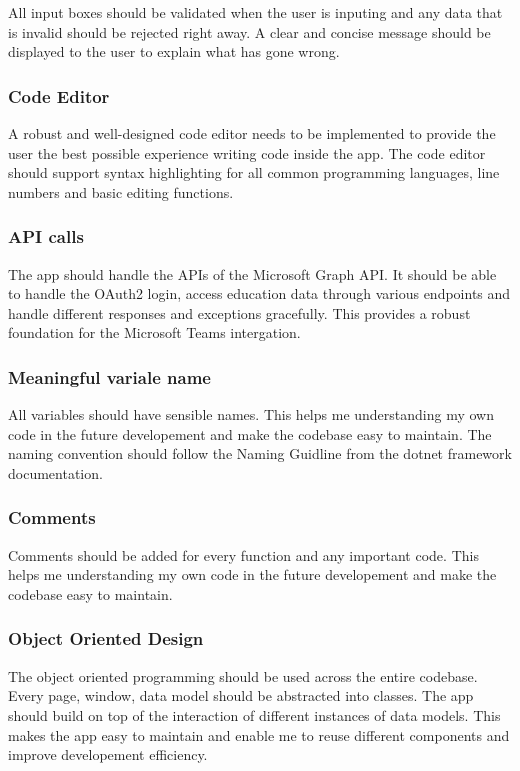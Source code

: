 \documentclass[a4paper]{report}
\begin{document}
All input boxes should be validated when the user is inputing and any data that is invalid should be rejected right away. A clear and concise message should be displayed to the user to explain what has gone wrong.

\subsubsection{Code Editor}

A robust and well-designed code editor needs to be implemented to provide the user the best possible experience writing code inside the app. The code editor should support syntax highlighting for all common programming languages, line numbers and basic editing functions.

\subsubsection{API calls}

The app should handle the APIs of the Microsoft Graph API. It should be able to handle the OAuth2 login, access education data through various endpoints and handle different responses and exceptions gracefully. This provides a robust foundation for the Microsoft Teams intergation.

\subsubsection{Meaningful variale name}

All variables should have sensible names. This helps me understanding my own code in the future developement and make the codebase easy to maintain. The naming convention should follow the Naming Guidline\cite{microsoft:docs:naming-guidelines} from the dotnet framework documentation. 

\subsubsection{Comments}

Comments should be added for every function and any important code. This helps me understanding my own code in the future developement and make the codebase easy to maintain.

\subsubsection{Object Oriented Design}

The object oriented programming should be used across the entire codebase. Every page, window, data model should be abstracted into classes. The app should build on top of the interaction of different instances of data models. This makes the app easy to maintain and enable me to reuse different components and improve developement efficiency.
\end{document}

